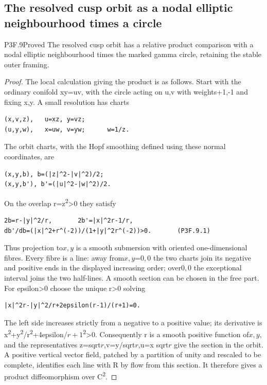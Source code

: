 \subsection{The resolved cusp orbit as a nodal elliptic neighbourhood times a circle}
\begin{statement}{P3F.9}{Proved}
The resolved cusp orbit has a relative product comparison with a nodal elliptic neighbourhood times the marked gamma circle, retaining the stable outer framing.
\end{statement}
\begin{proof}
The local calculation giving the product is as follows. Start with the ordinary conifold xy=uv, with the circle acting on u,v with weights+1,-1 and fixing x,y. A small resolution has charts

\begin{lstlisting}
(x,v,z),   u=xz, y=vz;
(u,y,w),   x=uw, v=yw;      w=1/z.
\end{lstlisting}

The orbit charts, with the Hopf smoothing defined using these normal coordinates, are

\begin{lstlisting}
(x,y,b), b=(|z|^2-|v|^2)/2;
(x,y,b'), b'=(|u|^2-|w|^2)/2.
\end{lstlisting}

On the overlap r=\textbar z\textbar\textsuperscript{2}\textgreater0 they satisfy

\begin{lstlisting}
2b=r-|y|^2/r,       2b'=|x|^2r-1/r,
db'/db=(|x|^2+r^(-2))/(1+|y|^2r^(-2))>0.       (P3F.9.1)
\end{lstlisting}

Thus projection to\(x,y\) is a smooth submersion with oriented one-dimensional fibres. Every fibre is a line: away from\(x,y\)=\(0,0\) the two charts join its negative and positive ends in the displayed increasing order; over\(0,0\) the exceptional interval joins the two half-lines. A smooth section can be chosen in the free part. For epsilon\textgreater0 choose the unique r\textgreater0 solving

\begin{lstlisting}
|x|^2r-|y|^2/r+2epsilon(r-1)/(r+1)=0.
\end{lstlisting}

The left side increases strictly from a negative to a positive value; its derivative is \textbar x\textbar\textsuperscript{2}+\textbar y\textbar\textsuperscript{2}/r\textsuperscript{2}+4epsilon/\(r+1\)\textsuperscript{2}\textgreater0. Consequently r is a smooth positive function of\(x,y\), and the representatives z=sqrt\(r\),v=y/sqrt\(r\),u=x sqrt\(r\) give the section in the orbit. A positive vertical vector field, patched by a partition of unity and rescaled to be complete, identifies each line with R by flow from this section. It therefore gives a product diffeomorphism over C\textsuperscript{2}.


\end{proof}
